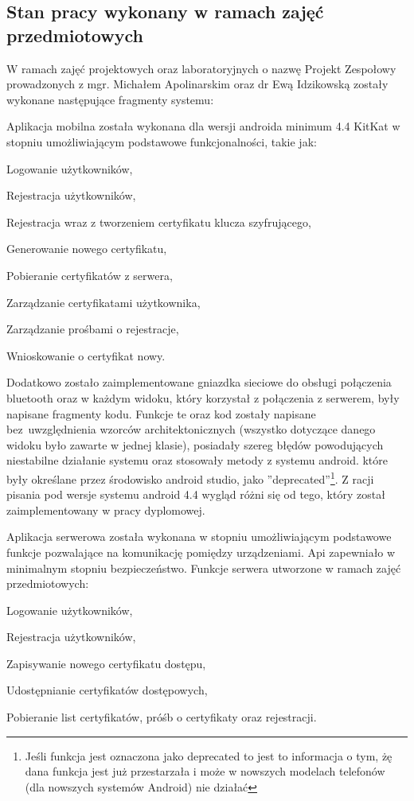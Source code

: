 \newpage
\subsection{Stan pracy wykonany w ramach zajęć przedmiotowych} \label{sec:Stan pracy wykonany w ramach zajęć przedmiotowych}
W ramach zajęć projektowych oraz laboratoryjnych o nazwę Projekt Zespołowy prowadzonych z mgr. Michałem Apolinarskim oraz dr Ewą Idzikowską zostały wykonane następujące fragmenty systemu:
	
	Aplikacja mobilna została wykonana dla wersji androida minimum 4.4 KitKat w stopniu umożliwiającym podstawowe funkcjonalności, takie jak:
	\begin{itemize*}
		\item Logowanie użytkowników,
		\item Rejestracja użytkowników,
		\item Rejestracja wraz z tworzeniem certyfikatu klucza szyfrującego,
		\item Generowanie nowego certyfikatu,
		\item Pobieranie certyfikatów z serwera,
		\item Zarządzanie certyfikatami użytkownika,
		\item Zarządzanie prośbami o rejestracje,
		\item Wnioskowanie o certyfikat nowy.
	\end{itemize*}

		Dodatkowo zostało zaimplementowane gniazdka sieciowe do obsługi połączenia bluetooth oraz w każdym widoku, który korzystał z połączenia z serwerem, były napisane fragmenty kodu. Funkcje te oraz kod zostały napisane bez~uwzględnienia wzorców architektonicznych (wszystko dotyczące danego widoku było zawarte w jednej klasie), posiadały szereg błędów powodujących niestabilne działanie systemu oraz stosowały metody z systemu android. które były określane przez środowisko android studio, jako ''deprecated''\footnote{ Jeśli funkcja jest oznaczona jako deprecated to jest to informacja o tym, żę dana funkcja jest już przestarzała i może w nowszych modelach telefonów (dla nowszych systemów Android) nie działać}. Z racji pisania pod wersje systemu android 4.4 wygląd różni się od tego, który został zaimplementowany w pracy dyplomowej.

   Aplikacja serwerowa została wykonana w stopniu umożliwiającym podstawowe funkcje pozwalające na komunikację pomiędzy urządzeniami. Api zapewniało w minimalnym stopniu bezpieczeństwo. Funkcje serwera utworzone w ramach zajęć przedmiotowych:
   	\begin{itemize*}
   		\item Logowanie użytkowników,
   		\item Rejestracja użytkowników,
   		\item Zapisywanie nowego certyfikatu dostępu,
   		\item Udostępnianie certyfikatów dostępowych,
   		\item Pobieranie list certyfikatów, próśb o certyfikaty oraz rejestracji.
   	\end{itemize*}
   
